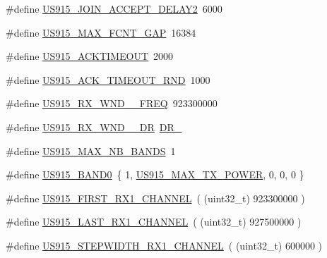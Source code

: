 \begin{DoxyCompactItemize}
\item 
\#define \mbox{\hyperlink{group___r_e_g_i_o_n_u_s915_ga3dc88cfa8f3ab79283a15fcb8cdcc722}{U\+S915\+\_\+\+J\+O\+I\+N\+\_\+\+A\+C\+C\+E\+P\+T\+\_\+\+D\+E\+L\+A\+Y2}}~6000
\item 
\#define \mbox{\hyperlink{group___r_e_g_i_o_n_u_s915_gaeade915fc815e603546a8bc14015cd16}{U\+S915\+\_\+\+M\+A\+X\+\_\+\+F\+C\+N\+T\+\_\+\+G\+AP}}~16384
\item 
\#define \mbox{\hyperlink{group___r_e_g_i_o_n_u_s915_ga4c39b2179e634fc588eb206e5b24fb8e}{U\+S915\+\_\+\+A\+C\+K\+T\+I\+M\+E\+O\+UT}}~2000
\item 
\#define \mbox{\hyperlink{group___r_e_g_i_o_n_u_s915_ga96a643ec88acfe0188587fd0ed6251e5}{U\+S915\+\_\+\+A\+C\+K\+\_\+\+T\+I\+M\+E\+O\+U\+T\+\_\+\+R\+ND}}~1000
\item 
\#define \mbox{\hyperlink{group___r_e_g_i_o_n_u_s915_ga0789b26b7a379ca9e5b13782bed55879}{U\+S915\+\_\+\+R\+X\+\_\+\+W\+N\+D\+\_\+\_\+\+F\+R\+EQ}}~923300000
\item 
\#define \mbox{\hyperlink{group___r_e_g_i_o_n_u_s915_ga51bf1d4da5e2926fb30c0e7b2eb3fcf3}{U\+S915\+\_\+\+R\+X\+\_\+\+W\+N\+D\+\_\+\_\+\+DR}}~\mbox{\hyperlink{group___r_e_g_i_o_n_ga44cc96ba80ae464cd9330b784d329c16}{D\+R\+\_}}
\item 
\#define \mbox{\hyperlink{group___r_e_g_i_o_n_u_s915_ga85b21b9c0af1bca8fb301bedf0be8fb7}{U\+S915\+\_\+\+M\+A\+X\+\_\+\+N\+B\+\_\+\+B\+A\+N\+DS}}~1
\item 
\#define \mbox{\hyperlink{group___r_e_g_i_o_n_u_s915_gafaab05d04cd5aa9b96a16ffd6b129c93}{U\+S915\+\_\+\+B\+A\+N\+D0}}~\{ 1, \mbox{\hyperlink{group___r_e_g_i_o_n_u_s915_gaa43b92e4e5cf26691dda96f7c4969c25}{U\+S915\+\_\+\+M\+A\+X\+\_\+\+T\+X\+\_\+\+P\+O\+W\+ER}}, 0, 0, 0 \}
\item 
\#define \mbox{\hyperlink{group___r_e_g_i_o_n_u_s915_ga8960a091cbb30429c6b69d4d528930d6}{U\+S915\+\_\+\+F\+I\+R\+S\+T\+\_\+\+R\+X1\+\_\+\+C\+H\+A\+N\+N\+EL}}~( (uint32\+\_\+t) 923300000 )
\item 
\#define \mbox{\hyperlink{group___r_e_g_i_o_n_u_s915_ga705af2829d7167acf3900be2b3c76dbb}{U\+S915\+\_\+\+L\+A\+S\+T\+\_\+\+R\+X1\+\_\+\+C\+H\+A\+N\+N\+EL}}~( (uint32\+\_\+t) 927500000 )
\item 
\#define \mbox{\hyperlink{group___r_e_g_i_o_n_u_s915_ga3840fba7fb88e029a0679cbc320552bf}{U\+S915\+\_\+\+S\+T\+E\+P\+W\+I\+D\+T\+H\+\_\+\+R\+X1\+\_\+\+C\+H\+A\+N\+N\+EL}}~( (uint32\+\_\+t) 600000 )
\end{DoxyCompactItemize}
